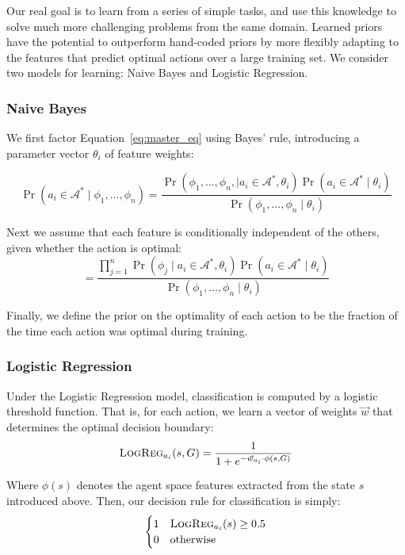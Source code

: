 \documentclass[11pt]{article}
\begin{document}
Our real goal is to learn from a series of simple tasks, and use this knowledge to solve much more challenging problems from the same domain.
Learned priors have the potential to outperform
hand-coded priors by more flexibly adapting to the
features that predict optimal actions over a large training set.
We consider two models for learning: Naive Bayes and Logistic Regression.

\subsubsection{Naive Bayes}
We first factor Equation~\ref{eq:master_eq} using Bayes' rule, introducing a parameter vector $\theta_i$ of
feature weights:

\begin{equation}
\Pr(a_i \in \mathcal{A}^*  \mid \phi_1, \ldots, \phi_n) = \frac{\Pr(\phi_1, \ldots, \phi_{n}, \mid a_i \in \mathcal{A}^*, \theta_i) \Pr(a_i \in \mathcal{A}^* \mid \theta_i)}{\Pr(\phi_1, \ldots, \phi_{n} \mid \theta_i)}
\label{eq:bayes}
\end{equation}

Next we assume that each feature is conditionally independent of the others, given whether the action is optimal:
\begin{equation}
= \frac{\prod_{j=1}^{n} \Pr(\phi_j \mid a_i \in \mathcal{A}^*, \theta_i) \Pr(a_i \in \mathcal{A}^* \mid \theta_i) }{\Pr(\phi_1, \ldots, \phi_{n} \mid \theta_i)}
\label{eq:final}
\end{equation}

Finally, we define the prior on the optimality of each action to be
the fraction of the time each action was optimal during training.

\subsubsection{Logistic Regression}

Under the Logistic Regression model, classification is computed by a logistic threshold function. That is, for each action, we learn a vector of weights $\vec{w}$ that determines the optimal decision boundary:
\begin{equation}
\textsc{LogReg}_{a_i}(s, G) = \frac{1}{1 + e^{-\vec{w}_{a_i} \cdot \phi(s, G)}}
\end{equation}

Where $\phi(s)$ denotes the agent space features extracted from the state $s$ introduced above. Then, our decision rule for classification is simply:
\begin{equation}
\begin{cases}
1&\textsc{LogReg}_{a_i}(s) \geq 0.5 \\
0&\text{otherwise}
\end{cases}
\end{equation}
\end{document}
